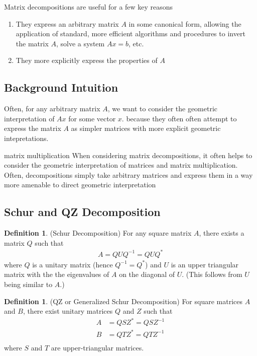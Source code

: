 \documentclass[12pt]{article}
\theoremstyle{plain}
\theoremstyle{definition}
\newtheorem{defn}[thm]{Definition}
\theoremstyle{remark}
\begin{document}
Matrix decompositions are useful for a few key reasons
\begin{enumerate}
\item They express an arbitrary matrix $A$ in some canonical form, allowing
  the application of standard, more efficient algorithms and procedures
  to invert the matrix $A$, solve a system $Ax =b$, etc.
\item They more explicitly express the properties of $A$ 
\end{enumerate}

\subsection{Background Intuition}

Often, for any arbitrary matrix $A$, we want to consider the geometric
interpretation of $Ax$ for some vector $x$. because they often often
attempt to express the matrix $A$ as simpler matrices with more explicit
geometric intepretations. 

matrix multiplication
When considering matrix decompositions, it often helps to consider the
geometric interpretation of matrices and matrix multiplication. Often,
decompositions simply take arbitrary matrices and express them in a way
more amenable to direct geometric interpretation

\subsection{Schur and QZ Decomposition}

\begin{defn}{(Schur Decomposition)}
For any square matrix $A$, there exists a matrix $Q$ such that
\begin{align*}
  A = Q U Q^{-1} = Q U Q^*
\end{align*}
where $Q$ is a unitary matrix (hence $Q^{-1} = Q^*$) and $U$ is an upper
triangular matrix with the the eigenvalues of $A$ on the diagonal of
$U$. (This follows from $U$ being similar to $A$.)
\end{defn}

\begin{defn}{(QZ or Generalized Schur Decomposition)}
For square matrices $A$ and $B$, there exist unitary matrices $Q$ and
$Z$ such that
\begin{align*}
  A &= Q S Z^* = QSZ^{-1} \\
  B &= Q T Z^* = QTZ^{-1} \\
\end{align*}
where $S$ and $T$ are upper-triangular matrices.
\end{defn}
\end{document}
